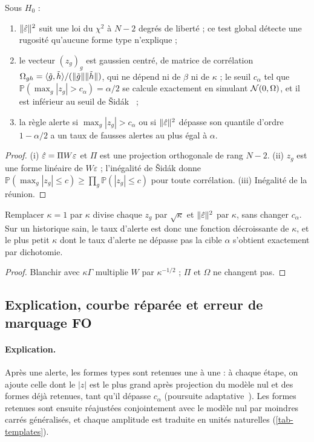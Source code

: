 \begin{proposition}\label{prop-family}
Sous $H_0$ :
\begin{enumerate}[label=(\roman*)]
\item $\lVert \hat\varepsilon\rVert^2$ suit une loi du $\chi^2$ à $N-2$ degrés de liberté ; ce test global détecte une rugosité
qu'aucune forme type n'explique ;
\item le vecteur $(z_g)_{g}$ est gaussien centré, de matrice de corrélation
$\Omega_{gh}=\langle \tilde g, \tilde h\rangle/(\lVert \tilde g\rVert\lVert \tilde h\rVert)$, qui ne dépend ni de $\beta$ ni de $\kappa$ ; le seuil
$c_\alpha$ tel que $\mathbb P(\max_g|z_g|>c_\alpha)=\alpha/2$ se calcule exactement en simulant $\mathcal{N}(0, \Omega)$, et il
est inférieur au seuil de Šidák~\cite{sidak1967} ;
\item la règle \og alerte si $\max_g|z_g|>c_\alpha$ ou si $\lVert \hat\varepsilon\rVert^2$ dépasse son quantile d'ordre $1-\alpha/2$
\fg{} a un taux de fausses alertes au plus égal à $\alpha$.
\end{enumerate}
\end{proposition}
\begin{proof}
(i) $\hat\varepsilon=\Pi W\varepsilon$ et $\Pi$ est une projection orthogonale de rang $N-2$. (ii) $z_g$ est une forme linéaire
de $W\varepsilon$ ; l'inégalité de Šidák donne $\mathbb P(\max_g|z_g|\le c)\ge\prod_g\mathbb P(|z_g|\le c)$ pour toute
corrélation. (iii) Inégalité de la réunion.
\end{proof}

\begin{proposition}\label{prop-kappa}
Remplacer $\kappa=1$ par $\kappa$ divise chaque $z_g$ par $\sqrt\kappa$ et $\lVert \hat\varepsilon\rVert^2$ par $\kappa$, sans changer
$c_\alpha$. Sur un historique sain, le taux d'alerte est donc une fonction décroissante de $\kappa$, et le plus petit
$\kappa$ dont le taux d'alerte ne dépasse pas la cible $\alpha$ s'obtient exactement par dichotomie.
\end{proposition}
\begin{proof}
Blanchir avec $\kappa\Gamma$ multiplie $W$ par $\kappa^{-1/2}$ ; $\Pi$ et $\Omega$ ne changent pas.
\end{proof}

\subsection{Explication, courbe réparée et erreur de marquage FO}\label{sec-attribution}
\paragraph{Explication.} Après une alerte, les formes types sont retenues une à une : à chaque étape, on ajoute celle
dont le $|z|$ est le plus grand après projection du modèle nul et des formes déjà retenues, tant qu'il dépasse
$c_\alpha$ (poursuite adaptative~\cite{mallat1993}). Les formes retenues sont ensuite réajustées conjointement avec le
modèle nul par moindres carrés généralisés, et chaque amplitude est traduite en unités naturelles
(\cref{tab-templates}).

